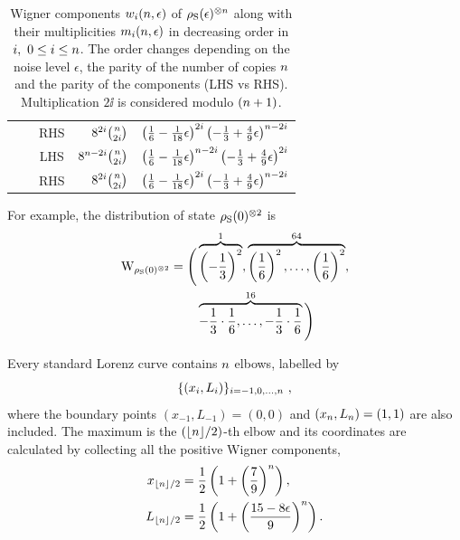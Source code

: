 \begin{table}[h]
\begin{tabular}{c|c|c|r|r}
    & & RHS & $8^{2i}\binom{n}{2i}$ & $\left( \frac{1}{6} - \frac{1}{18}\epsilon \right)^{2i}\left( -\frac{1}{3} + \frac{4}{9}\epsilon \right)^{n-2i}$ \\ \cline{2-5}
    & \multirow{2}{*}{\raisebox{-2ex}{\rotatebox[origin=c]{90}{$\NN$ odd}}} & LHS & $8^{n-2i}\binom{n}{2i}$ & $\left( \frac{1}{6} - \frac{1}{18}\epsilon \right)^{n-2i}\left( -\frac{1}{3} + \frac{4}{9}\epsilon \right)^{2i}$ \\
    & & RHS & $8^{2i}\binom{n}{2i}$ & $\left( \frac{1}{6} - \frac{1}{18}\epsilon \right)^{2i}\left( -\frac{1}{3} + \frac{4}{9}\epsilon \right)^{n-2i}$ \\ \hline
  \end{tabular}
  \caption{Wigner components $w_{i}(n, \epsilon)$ of $\rho_{\rm{S}}(\epsilon)^{\otimes n}$ along with their multiplicities $m_{i}(n, \epsilon)$ in decreasing order in $i,\ 0 \leq i \leq n$.
  The order changes depending on the noise level $\epsilon$, the parity of the number of copies $\NN$ and the parity of the components (LHS vs RHS).
  Multiplication $2\ii$ is considered modulo $(n+1)$.}
  \label{tab:lcsu}
\end{table}

For example, the distribution of state $\rho_{\rm{S}}(0)^{\otimes 2}$ is
\begin{equation*}
	\begin{split}
	\rm{W}_{\rho_{\rm{S}}(0)^{\otimes 2}} = \Bigg( &\overbrace{\left( -\frac{1}{3} \right)^2}^1, \overbrace{\left( \frac{1}{6} \right)^2, \dots, \left( \frac{1}{6} \right)^2}^{64}, \\
	&\overbrace{ -\frac{1}{3} \cdot \frac{1}{6}, \dots, -\frac{1}{3} \cdot \frac{1}{6}}^{16} \Bigg)
	\end{split}
\end{equation*}

Every standard Lorenz curve contains $\NN$ elbows, labelled by 
\begin{equation*}
\{(x_{\ii}, L_{\ii})\}_{\ii=-1,0,\dots,\NN}\ ,
\end{equation*}
where the boundary points $(x_{-1}, L_{-1}) = (0,0)$ and $(x_{n}, L_{n}) = (1,1)$ are also included.
The maximum is the $(\lfloor n \rfloor/2)$-th elbow and its coordinates are calculated by collecting all the positive Wigner components,
\begin{align}
	x_{\lfloor n \rfloor/2} &= \frac{1}{2}\left(1 + \left(\frac{7}{9}\right)^n\right), \\
	L_{\lfloor n \rfloor/2} &= \frac{1}{2}\left (1 + \left(\frac{15 - 8\epsilon}{9}\right)^n \right).
\end{align}

